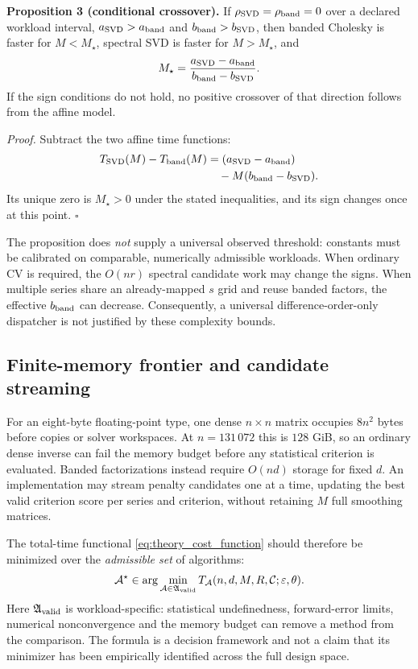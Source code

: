 \noindent\textbf{Proposition 3 (conditional crossover).}
If $\rho_{\rm SVD}=\rho_{\rm band}=0$
over a declared workload interval,
$a_{\rm SVD}>a_{\rm band}$ and
$b_{\rm band}>b_{\rm SVD}$, then banded
Cholesky is faster for
$M<M_\star$, spectral SVD is faster for
$M>M_\star$, and
\begin{equation}\label{eq:theory_threshold}
M_\star=
\frac{a_{\rm SVD}-a_{\rm band}}
{b_{\rm band}-b_{\rm SVD}}.
\end{equation}
If the sign conditions do not hold, no
positive crossover of that direction
follows from the affine model.

\noindent\emph{Proof.}
Subtract the two affine time functions:
\[
\begin{aligned}
T_{\rm SVD}(M)-T_{\rm band}(M)
&=(a_{\rm SVD}-a_{\rm band})\\
&\quad-M(b_{\rm band}-b_{\rm SVD}).
\end{aligned}
\]
Its unique zero is $M_\star>0$ under
the stated inequalities, and its
sign changes once at this point.
\hfill$\square$

The proposition does \emph{not} supply a
universal observed threshold: constants
must be calibrated on comparable,
numerically admissible workloads.
When ordinary CV is required, the
$O(nr)$ spectral candidate work may
change the signs. When multiple series
share an already-mapped $s$ grid and
reuse banded factors, the effective
$b_{\rm band}$ can decrease. Consequently,
a universal difference-order-only
dispatcher is not justified by these
complexity bounds.

\subsection{Finite-memory frontier and candidate streaming}
For an eight-byte floating-point type,
one dense $n\times n$ matrix occupies
$8n^2$ bytes before copies or solver
workspaces. At $n=131\,072$ this is
$128$ GiB, so an ordinary dense inverse
can fail the memory budget before any
statistical criterion is evaluated.
Banded factorizations instead require
$O(nd)$ storage for fixed $d$.
An implementation may stream penalty
candidates one at a time, updating the
best valid criterion score per series
and criterion, without retaining $M$
full smoothing matrices.

The total-time functional
\eqref{eq:theory_cost_function} should
therefore be minimized over the
\emph{admissible set} of algorithms:
\begin{equation}\label{eq:theory_frontier}
\mathcal A^\star
\in\arg\min_{\mathcal A\in\mathfrak A_{\rm valid}}
T_{\mathcal A}(n,d,M,R,\mathcal C;\varepsilon,\theta).
\end{equation}
Here $\mathfrak A_{\rm valid}$ is
workload-specific: statistical
undefinedness, forward-error limits,
numerical nonconvergence and the memory
budget can remove a method from the
comparison. The formula is a
decision framework and not a claim
that its minimizer has been
empirically identified across the
full design space.

